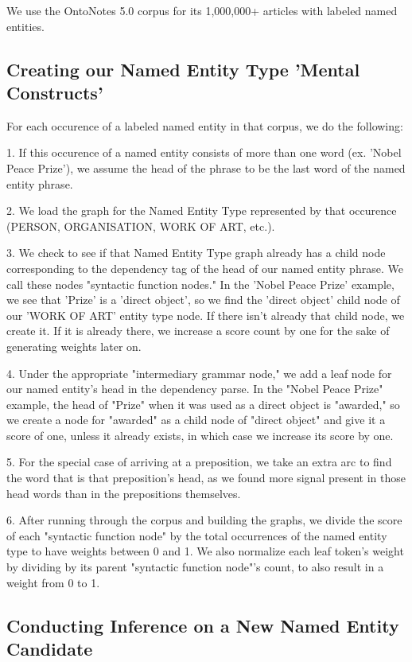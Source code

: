 \documentclass[11pt,a4paper]{article}
\begin{document}
We use the OntoNotes 5.0 corpus for its 1,000,000+ articles with labeled named entities.

\subsection{Creating our Named Entity Type 'Mental Constructs'}

For each occurence of a labeled named entity in that corpus, we do the following:

1. If this occurence of a named entity consists of more than one word (ex. 'Nobel Peace Prize'), we assume the head of the phrase to be the last word of the named entity phrase.

2. We load the graph for the Named Entity Type represented by that occurence (PERSON, ORGANISATION, WORK OF ART, etc.).

3. We check to see if that Named Entity Type graph already has a child node corresponding to the dependency tag of the head of our named entity phrase. We call these nodes "syntactic function nodes."  In the 'Nobel Peace Prize' example, we see that 'Prize' is a 'direct object', so we find the 'direct object' child node of our 'WORK OF ART' entity type node. If there isn't already that child node, we create it. If it is already there, we increase a score count by one for the sake of generating weights later on.

4. Under the appropriate "intermediary grammar node," we add a leaf node for our named entity's head in the dependency parse. In the "Nobel Peace Prize" example, the head of "Prize" when it was used as a direct object is "awarded," so we create a node for "awarded" as a child node of "direct object" and give it a score of one, unless it already exists, in which case we increase its score by one.

5. For the special case of arriving at a preposition, we take an extra arc to find the word that is that preposition's head, as we found more signal present in those head words than in the prepositions themselves.

6. After running through the corpus and building the graphs, we divide the score of each "syntactic function node" by the total occurrences of the named entity type to have weights between 0 and 1. We also normalize each leaf token's weight by dividing by its parent "syntactic function node"'s count, to also result in a weight from 0 to 1.

\subsection{Conducting Inference on a New Named Entity Candidate}
\end{document}
